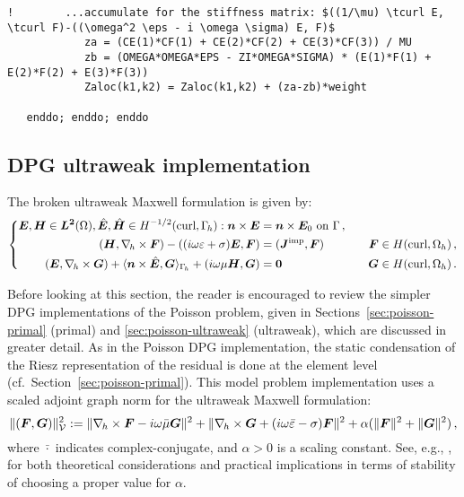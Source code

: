 \begin{lstlisting}[mathescape,caption=\file{MAXWELL/GALERKIN/}\routine{elem} routine]
!        ...accumulate for the stiffness matrix: $((1/\mu) \tcurl E, \tcurl F)-((\omega^2 \eps - i \omega \sigma) E, F)$
            za = (CE(1)*CF(1) + CE(2)*CF(2) + CE(3)*CF(3)) / MU
            zb = (OMEGA*OMEGA*EPS - ZI*OMEGA*SIGMA) * (E(1)*F(1) + E(2)*F(2) + E(3)*F(3))
            Zaloc(k1,k2) = Zaloc(k1,k2) + (za-zb)*weight

   enddo; enddo; enddo
\end{lstlisting}

\subsection{DPG ultraweak implementation}
\label{sec:maxwell-ultraweak}

The broken ultraweak Maxwell formulation is given by:
\[
\left\{
\begin{split}
	\boldsymbol E, \boldsymbol H \in \boldsymbol{L^2}(\Omega), \hat{\boldsymbol E}, \hat{\boldsymbol H} \in H^{-1/2}(\text{curl}, \Gamma_{\hskip -1pt h}): \boldsymbol n \times \boldsymbol E &= \boldsymbol n \times \boldsymbol E_0 \text{ on } \Gamma \, , \\
	(\boldsymbol H, \nabla_{\hspace{-1pt}h} \times \boldsymbol F) - ((i \omega \varepsilon + \sigma) \boldsymbol E , \boldsymbol F)
	&= (\boldsymbol J^{\text{imp}}, \boldsymbol F) &\quad \boldsymbol F \in H(\text{curl}, \Omega_h) \, , \\
	(\boldsymbol E, \nabla_{\hspace{-1pt}h} \times \boldsymbol G) + \langle \boldsymbol n \times \hat{\boldsymbol E}, \boldsymbol G \rangle_{\Gamma_{\hskip -1pt h}} + (i \omega \mu \boldsymbol H, \boldsymbol G)
	&= \boldsymbol 0 &\quad \boldsymbol G \in H(\text{curl}, \Omega_h) \, .
\end{split}
\right .
\]

Before looking at this section, the reader is encouraged to review the simpler DPG implementations of the Poisson problem, given in Sections~\ref{sec:poisson-primal} (primal) and \ref{sec:poisson-ultraweak} (ultraweak), which are discussed in greater detail. As in the Poisson DPG implementation, the static condensation of the Riesz representation of the residual is done at the element level (cf.~Section~\ref{sec:poisson-primal}). This model problem implementation uses a scaled adjoint graph norm for the ultraweak Maxwell formulation:
\[
	\| ( \boldsymbol F, \boldsymbol G ) \|^2_{\mathcal{V}} :=
	\| \nabla_{\hspace{-1pt}h} \times \boldsymbol F - i \omega \bar{\mu} \boldsymbol G \|^2 +
	\| \nabla_{\hspace{-1pt}h} \times \boldsymbol G + (i \omega \bar{\varepsilon} - \sigma) \boldsymbol F \|^2 +
	\alpha ( \| \boldsymbol F \|^2 + \| \boldsymbol G \|^2) \, ,
\]
where $\bar{\cdot}$ indicates complex-conjugate, and $\alpha > 0$ is a scaling constant. See, e.g., \cite{melenk2023waveguide1, demkowicz2023waveguide2}, for both theoretical considerations and practical implications in terms of stability of choosing a proper value for $\alpha$.

